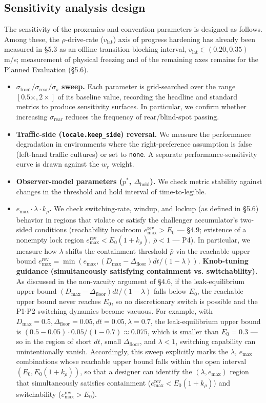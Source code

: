 \documentclass[11pt]{article}
\newcommand{\Dfloor}{\Delta_{\text{floor}}}
\newcommand{\Eremax}{e^{\text{rev}}_{\max}}
\newcommand{\code}[1]{\texttt{#1}}
\begin{document}
\FloatBarrier
\subsection{Sensitivity analysis design}

The sensitivity of the proxemics and convention parameters is designed as follows. Among these, the $\rho$-drive-rate ($v_{\text{lat}}$) axis of progress hardening has already been measured in \S5.3 as an offline transition-blocking interval, $v_{\text{lat}} \in (0.20, 0.35)$ m/s; measurement of physical freezing and of the remaining axes remains for the Planned Evaluation (\S5.6).

\begin{itemize}
\item \textbf{$\sigma_{\text{front}}/\sigma_{\text{rear}}/\sigma_s$ sweep.} Each parameter is grid-searched over the range $[0.5\times, 2\times]$ of its baseline value, recording the headline and standard metrics to produce sensitivity surfaces. In particular, we confirm whether increasing $\sigma_{\text{rear}}$ reduces the frequency of rear/blind-spot passing.
\item \textbf{Traffic-side (\code{locale.keep\_side}) reversal.} We measure the performance degradation in environments where the right-preference assumption is false (left-hand traffic cultures) or set to \code{none}. A separate performance-sensitivity curve is drawn against the $w_r$ weight.
\item \textbf{Observer-model parameters ($p^*$, $\Delta_{\text{hold}}$).} We check metric stability against changes in the threshold and hold interval of time-to-legible.
\item \textbf{$e_{\max}\cdot\lambda\cdot k_\rho$.} We check switching-rate, windup, and lockup (as defined in \S5.6) behavior in regions that violate or satisfy the challenger accumulator's two-sided conditions (reachability headroom $\Eremax > E_0$ --- \S4.9; existence of a nonempty lock region $\Eremax < E_0(1+k_\rho)$, $\bar\rho < 1$ --- P4). In particular, we measure how $\lambda$ shifts the containment threshold $\bar\rho$ via the reachable upper bound $\Eremax = \min(e_{\max}, (D_{\max}-\Dfloor)dt/(1-\lambda))$. \textbf{Knob-tuning guidance (simultaneously satisfying containment vs. switchability).} As discussed in the non-vacuity argument of \S4.6, if the leak-equilibrium upper bound $(D_{\max}-\Dfloor)dt/(1-\lambda)$ falls below $E_0$, the reachable upper bound never reaches $E_0$, so no discretionary switch is possible and the P1$\cdot$P2 switching dynamics become vacuous. For example, with $D_{\max}=0.5, \Dfloor=0.05, dt=0.05, \lambda=0.7$, the leak-equilibrium upper bound is $(0.5-0.05)\cdot0.05/(1-0.7) \approx 0.075$, which is smaller than $E_0=0.3$ --- so in the region of short $dt$, small $\Dfloor$, and $\lambda<1$, switching capability can unintentionally vanish. Accordingly, this sweep explicitly marks the $\lambda$, $e_{\max}$ combinations whose reachable upper bound falls within the open interval $(E_0, E_0(1+k_\rho))$, so that a designer can identify the $(\lambda, e_{\max})$ region that simultaneously satisfies containment ($\Eremax < E_0(1+k_\rho)$) and switchability ($\Eremax > E_0$).

\end{itemize}
\end{document}

